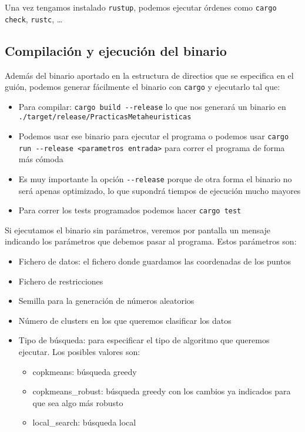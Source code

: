 \documentclass[11pt]{article}
\begin{document}
Una vez tengamos instalado \lstinline{rustup}, podemos ejecutar órdenes como \lstinline{cargo check}, \lstinline{rustc}, \ldots


\subsection{Compilación y ejecución del binario}

Además del binario aportado en la estructura de directios que se especifica en el guión, podemos generar fácilmente el binario con \lstinline{cargo} y ejecutarlo tal que:

\begin{itemize}
    \item Para compilar: \lstinline{cargo build --release} lo que nos generará un binario en \lstinline{./target/release/PracticasMetaheuristicas}
    \item Podemos usar ese binario para ejecutar el programa o podemos usar \lstinline{cargo run --release <parametros entrada>} para correr el programa de forma más cómoda
    \item Es muy importante la opción \lstinline{--release} porque de otra forma el binario no será apenas optimizado, lo que supondrá tiempos de ejecución mucho mayores
    \item Para correr los tests programados podemos hacer \lstinline{cargo test}
\end{itemize}

Si ejecutamos el binario sin parámetros, veremos por pantalla un mensaje indicando los parámetros que debemos pasar al programa. Estos parámetros son:

\begin{itemize}
    \item Fichero de datos: el fichero donde guardamos las coordenadas de los puntos
    \item Fichero de restricciones
    \item Semilla para la generación de números aleatorios
    \item Número de clusters en los que queremos clasificar los datos
    \item Tipo de búsqueda: para especificar el tipo de algoritmo que queremos ejecutar. Los posibles valores son:
    \begin{itemize}
        \item copkmeans: búsqueda greedy
        \item copkmeans\_robust: búsqueda greedy con los cambios ya indicados para que sea algo más robusto
        \item local\_search: búsqueda local
    \end{itemize}
\end{itemize}
\end{document}
